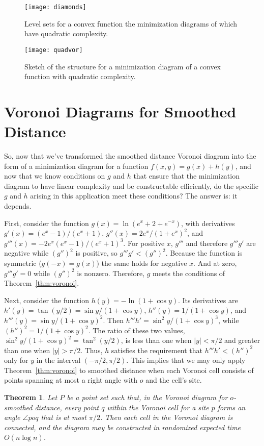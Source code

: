 \documentclass[10pt, conference, compsocconf]{IEEEtran}
\newtheorem{theorem}{Theorem}
\begin{document}
\begin{figure}[hb]
\centering\texttt{[image: diamonds]}
\caption{Level sets for a convex function the minimization diagrams of which have quadratic complexity.}
\label{fig:diamonds}
\end{figure}

\begin{figure}[hb]
\centering\texttt{[image: quadvor]}
\caption{Sketch of the structure for a minimization diagram of a convex function with quadratic complexity.}
\label{fig:quadvor}
\end{figure}

\section{Voronoi Diagrams for Smoothed Distance}

So, now that we've transformed the smoothed distance Voronoi diagram into the form of a minimization diagram for a function $f(x,y)=g(x)+h(y)$, and now that we know conditions on $g$ and $h$ that ensure that the minimization diagram to have linear complexity and be constructable efficiently, do the specific $g$ and $h$ arising in this application meet these conditions? The answer is: it depends.

First, consider the function $g(x)=\ln(e^{x} + 2+e^{-x})$, with derivatives
$g'(x) =(e^x-1)/(e^x+1)$,
$g''(x) = {2e^x}/{(1+e^x)^2}$, and
$g'''(x) = -{2e^x(e^x-1)}/{(e^x+1)^3}$.
For positive $x$, $g'''$ and therefore $g'''g'$ are negative while $(g'')^2$ is positive, so $g'''g'<(g'')^2$.
Because the function is symmetric ($g(-x)=g(x)$) the same holds for negative $x$.
And at zero, $g'''g'=0$ while $(g'')^2$ is nonzero. Therefore, $g$ meets the conditions of Theorem~\ref{thm:voronoi}.

Next, consider the function $h(y)=-\ln(1+\cos y)$. Its derivatives are
$h'(y)=\tan(y/2)=\sin y/(1+\cos y)$,
$h''(y)=1/(1+\cos y)$, and
$h'''(y)=\sin y/(1+\cos y)^2$.
Then $h'''h'=\sin^2 y/(1+\cos y)^3$, while $(h'')^2=1/(1+\cos y)^2$.
The ratio of these two values, $\sin^2 y/(1+\cos y)^2=\tan^2(y/2)$, is less than one
when $|y|<\pi/2$ and greater than one when $|y|>\pi/2$. Thus, $h$ satisfies the requirement that $h'''h'<(h'')^2$ only for $y$ in the interval $(-\pi/2,\pi/2)$. This implies that we may only apply Theorem~\ref{thm:voronoi} to smoothed distance when each Voronoi cell consists of points spanning at most a right angle with $o$ and the cell's site.

\begin{theorem}
\label{thm:smoothed}
Let $P$ be a point set such that, in the Voronoi diagram for $o$-smoothed distance, every point $q$ within the Voronoi cell for a site $p$ forms an angle $\angle poq$ that is at most $\pi/2$.  Then each cell in the Voronoi diagram is connected, and the diagram may be constructed in randomized expected time $O(n\log n)$.
\end{theorem}
\end{document}
